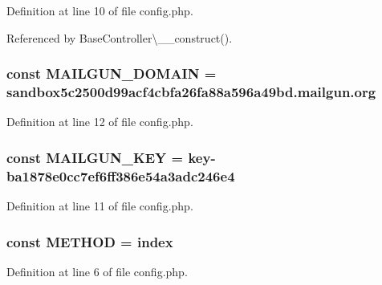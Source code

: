 Definition at line 10 of file config.\+php.



Referenced by Base\+Controller\textbackslash{}\+\_\+\+\_\+construct().

\hypertarget{config_8php_a2de069ac064bb137af53d99e3fcff3c8}{}
\subsubsection[{M\+A\+I\+L\+G\+U\+N\+\_\+\+D\+O\+M\+A\+I\+N}]{\setlength{\rightskip}{0pt plus 5cm}const M\+A\+I\+L\+G\+U\+N\+\_\+\+D\+O\+M\+A\+I\+N = \textquotesingle{}sandbox5c2500d99acf4cbfa26fa88a596a49bd.\+mailgun.\+org\textquotesingle{}}\label{config_8php_a2de069ac064bb137af53d99e3fcff3c8}


Definition at line 12 of file config.\+php.

\hypertarget{config_8php_ad320bd8d96c22e094fb9b774f269aaef}{}
\subsubsection[{M\+A\+I\+L\+G\+U\+N\+\_\+\+K\+E\+Y}]{\setlength{\rightskip}{0pt plus 5cm}const M\+A\+I\+L\+G\+U\+N\+\_\+\+K\+E\+Y = \textquotesingle{}key-\/ba1878e0cc7ef6ff386e54a3adc246e4\textquotesingle{}}\label{config_8php_ad320bd8d96c22e094fb9b774f269aaef}


Definition at line 11 of file config.\+php.

\hypertarget{config_8php_a9d70943cac2f50debb62d2008a6e768d}{}
\subsubsection[{M\+E\+T\+H\+O\+D}]{\setlength{\rightskip}{0pt plus 5cm}const M\+E\+T\+H\+O\+D = \textquotesingle{}index\textquotesingle{}}\label{config_8php_a9d70943cac2f50debb62d2008a6e768d}


Definition at line 6 of file config.\+php.




